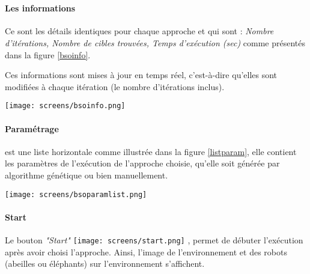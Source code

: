 	\textbf{ }\\
	
	\noindent
	\begin{minipage}{0.6\textwidth}
		\paragraph{Les informations}
		Ce sont les détails identiques pour chaque approche et qui sont :
		\textit{Nombre d'itérations, Nombre de cibles trouvées, Temps d'exécution (sec)} comme présentés dans la figure \ref{bsoinfo}.
		
		Ces informations sont mises à jour en temps réel,  c'est-à-dire qu'elles sont modifiées à chaque itération (le nombre d'itérations inclus).
	\end{minipage}
	\begin{minipage}{0.4\textwidth}
		\captionsetup{width=0.7\linewidth}
		\centering
		\texttt{[image: screens/bsoinfo.png]}%
		\vspace{-0.1 cm}
		\label{bsoinfo}%
	\end{minipage}
	
	
	
	
	
	\paragraph{Paramétrage} est une liste horizontale comme illustrée dans la figure \ref{listparam}, elle contient les paramètres de l'exécution de l'approche choisie, qu'elle soit générée par algorithme génétique ou bien manuellement.
	
	
	\begin{center}	  
		\captionsetup{width=1\linewidth}
		\texttt{[image: screens/bsoparamlist.png]}%
		\vspace{-0.1 cm}
		\label{listparam}%
	\end{center}
	
	
	\paragraph{Start}
	Le bouton \textit{"Start"} \texttt{[image: screens/start.png]} , permet de débuter l'exécution après avoir choisi l'approche.
	Ainsi, l'image de l'environnement et des robots (abeilles ou éléphants) sur l'environnement s'affichent.
	
